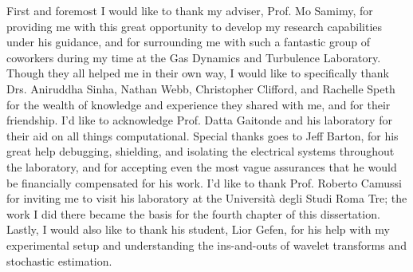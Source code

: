 \begin{acknowledgements}
First and foremost I would like to thank my adviser, Prof. Mo Samimy, for providing me with this great opportunity to develop my research capabilities under his guidance, and for surrounding me with such a fantastic group of coworkers during my time at the Gas Dynamics and Turbulence Laboratory.
Though they all helped me in their own way, I would like to specifically thank Drs. Aniruddha Sinha, Nathan Webb, Christopher Clifford, and Rachelle Speth for the wealth of knowledge and experience they shared with me, and for their friendship.
I'd like to acknowledge Prof. Datta Gaitonde and his laboratory for their aid on all things computational.
Special thanks goes to Jeff Barton, for his great help debugging, shielding, and isolating the electrical systems throughout the laboratory, and for accepting even the most vague assurances that he would be financially compensated for his work. 
I'd like to thank Prof. Roberto Camussi for inviting me to visit his laboratory at the Universit\`{a} degli Studi Roma Tre; the work I did there became the basis for the fourth chapter of this dissertation.
Lastly, I would also like to thank his student, Lior Gefen, for his help with my experimental setup and understanding the ins-and-outs of wavelet transforms and stochastic estimation.
\end{acknowledgements}

